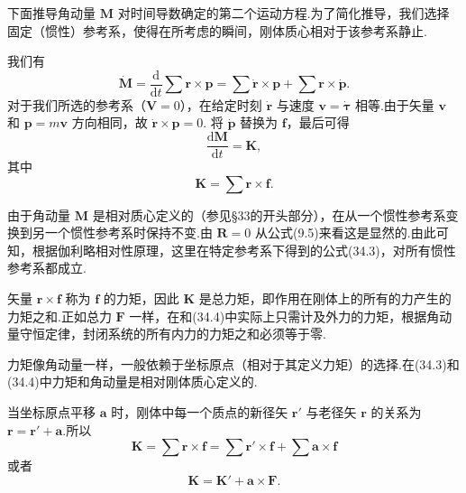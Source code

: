 下面推导角动量 $\boldsymbol{M}$ 对时间导数确定的第二个运动方程.为了简化推导，我们选择固定（惯性）参考系，使得在所考虑的瞬间，刚体质心相对于该参考系静止.

我们有
\begin{equation*}
  \dot{\boldsymbol{M}}=\frac{\mathrm{d}}{\mathrm{d}t}\sum\boldsymbol{r}\times\boldsymbol{p}
  =\sum\dot{\boldsymbol{r}}\times\boldsymbol{p}
  +\sum\boldsymbol{r}\times\dot{\boldsymbol{p}}.
\end{equation*}
对于我们所选的参考系（$\boldsymbol{V}=0$），在给定时刻 $\dot{\boldsymbol{r}}$ 与速度
$\boldsymbol{v}=\dot{\boldsymbol{\tau}}$ 相等.由于矢量 $\boldsymbol{v}$ 和
$\boldsymbol{p}=m\boldsymbol{v}$ 方向相同，故 $\dot{\boldsymbol{r}}\times\boldsymbol{p}=0$.
将 $\dot{\boldsymbol{p}}$ 替换为 $\boldsymbol{f}$，最后可得
\begin{equation}
  \frac{\mathrm{d}\boldsymbol{M}}{\mathrm{d}t}=\boldsymbol{K},
\end{equation}
其中
\begin{equation}
  \boldsymbol{K}=\sum\boldsymbol{r}\times\boldsymbol{f}.
\end{equation}

由于角动量 $\boldsymbol{M}$ 是相对质心定义的（参见§33的开头部分），在从一个惯性参考系变换到另一个惯性参考系时保持不变.由 $\boldsymbol{R}=0$ 从公式(9.5)来看这是显然的.由此可知，根据伽利略相对性原理，这里在特定参考系下得到的公式(34.3)，对所有惯性参考系都成立.

矢量 $\boldsymbol{r}\times\boldsymbol{f}$ 称为 $\boldsymbol{f}$ 的力矩，因此 $\boldsymbol{K}$ 是总力矩，即作用在刚体上的所有的力产生的力矩之和.正如总力 $\boldsymbol{F}$ 一样，在和(34.4)中实际上只需计及外力的力矩，根据角动量守恒定律，封闭系统的所有内力的力矩之和必须等于零.

力矩像角动量一样，一般依赖于坐标原点（相对于其定义力矩）的选择.在(34.3)和(34.4)中力矩和角动量是相对刚体质心定义的.

当坐标原点平移 $\boldsymbol{a}$ 时，刚体中每一个质点的新径矢 $\boldsymbol{r}'$ 与老径矢 $\boldsymbol{r}$ 的关系为
$\boldsymbol{r}=\boldsymbol{r}'+\boldsymbol{a}$.所以
\begin{equation*}
  \boldsymbol{K}=\sum\boldsymbol{r}\times\boldsymbol{f}
  =\sum\boldsymbol{r}'\times\boldsymbol{f}
  +\sum\boldsymbol{a}\times\boldsymbol{f}
\end{equation*}
或者
\begin{equation}
  \boldsymbol{K}=\boldsymbol{K}'+\boldsymbol{a}\times\boldsymbol{F}.
\end{equation}

